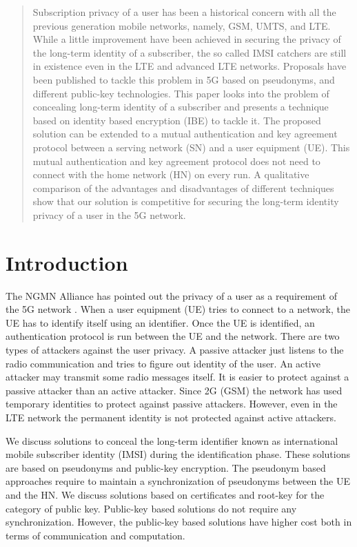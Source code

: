 \documentclass{llncs} %
\begin{document}
\begin{abstract}
Subscription privacy of a user has been a historical concern with all the previous generation mobile networks, namely, GSM, UMTS, and LTE. While a little improvement have been achieved in securing the privacy of the long-term identity of a subscriber, the so called IMSI catchers are still in existence even in the LTE and advanced LTE networks. Proposals have been published to tackle this problem in 5G based on pseudonyms, and different public-key technologies. This paper looks into the problem of concealing long-term identity of a subscriber and presents a technique based on identity based encryption (IBE) to tackle it. The proposed solution can be extended to a mutual authentication and key agreement protocol between a serving network (SN) and a user equipment (UE). This mutual authentication and key agreement protocol does not need to connect with the home network (HN) on every run. A qualitative comparison of the advantages and disadvantages of different techniques show that our solution is competitive for securing the long-term identity privacy of a user in the 5G network.
\end{abstract}


\section{Introduction}
\label{intro} The NGMN Alliance has pointed out the privacy of a user as a requirement of the 5G network \cite{NGMN_white_paper}. When a user equipment (UE) tries to connect to a network, the UE has to identify itself using an identifier. Once the UE is identified, an authentication protocol is run between the UE and the network. There are two types of attackers against the user privacy. A passive attacker just listens to the radio communication and tries to figure out identity of the user. An active attacker may transmit some radio messages itself. It is easier to protect against a passive attacker than an active attacker. Since 2G (GSM) the network has used temporary identities to protect against passive attackers. However, even in the LTE network the permanent identity is not protected against active attackers.

We discuss solutions to conceal the long-term identifier known as international mobile subscriber identity (IMSI) during the identification phase. These solutions are based on pseudonyms and public-key encryption. The pseudonym based approaches require to maintain a synchronization of pseudonyms between the UE and the HN. We discuss solutions based on certificates and root-key for the category of public key. Public-key based solutions do not require any synchronization. However, the public-key based solutions have higher cost both in terms of communication and computation. 
\end{document}
